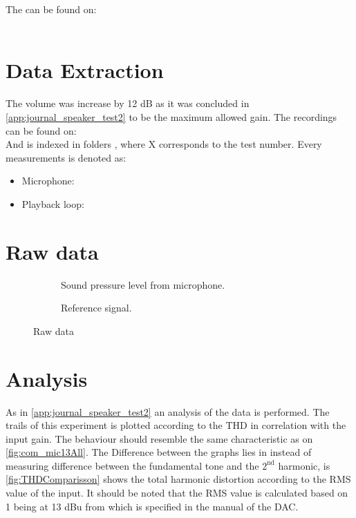 The  can be found on:\\
\\

\section{Data Extraction}
The volume was increase by 12 dB as it was concluded in \autoref{app:journal_speaker_test2} to be the maximum allowed gain.
The recordings can be found on:\\
And is indexed in folders , where X corresponds to the test number. Every measurements is denoted as:
\begin{itemize}
\item Microphone: 
\item Playback loop: 
\end{itemize}


\section{Raw data}

\begin{figure}[H]
\centering
\begin{subfigure}[t]{0.45\textwidth}
    \centering
    
    \caption{Sound pressure level from microphone.}
    \label{fig:raw1t3_mic1}
\end{subfigure}
\begin{subfigure}[t]{0.45\textwidth}
    \centering
    
    \caption{Reference signal.}
    \label{fig:raw1t3_reference1}
\end{subfigure}
\caption{Raw data}
\label{fig:raw1t3}
\end{figure} 


\section{Analysis}

As in \autoref{app:journal_speaker_test2} an analysis of the data is performed. The trails of this experiment is plotted according to the THD in correlation with the input gain. The behaviour should resemble the same characteristic as on \autoref{fig:com_mic13All}. The Difference between the graphs lies in instead of measuring difference between the fundamental tone and the $\text{2}^{\text{nd}}$ harmonic, is \autoref{fig:THDComparisson} shows the total harmonic distortion according to the RMS value of the input. It should be noted that the RMS value is calculated based on 1 being at 13 dBu from which is specified in the manual of the DAC.


